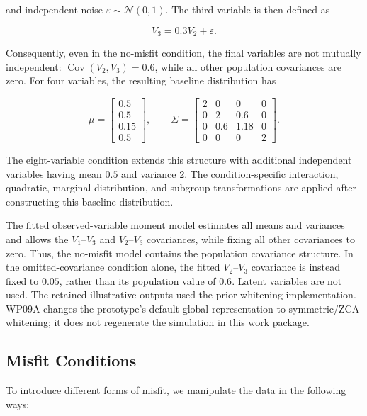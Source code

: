 \documentclass[floatsintext,a4paper]{apa7} %
\begin{document}
	and independent noise $\varepsilon\sim\mathcal{N}(0,1)$. The third variable is then defined as
	
	$$
	V_3=0.3V_2+\varepsilon.
	$$
	
	Consequently, even in the no-misfit condition, the final variables are not mutually independent: $\operatorname{Cov}(V_2,V_3)=0.6$, while all other population covariances are zero. For four variables, the resulting baseline distribution has
	
	$$
	\mu=
	\begin{bmatrix}
		0.5\\
		0.5\\
		0.15\\
		0.5
	\end{bmatrix},
	\qquad
	\Sigma=
	\begin{bmatrix}
		2 & 0 & 0 & 0 \\
		0 & 2 & 0.6 & 0 \\
		0 & 0.6 & 1.18 & 0 \\
		0 & 0 & 0 & 2
	\end{bmatrix}.
	$$
	
	The eight-variable condition extends this structure with additional independent variables having mean $0.5$ and variance $2$. The condition-specific interaction, quadratic, marginal-distribution, and subgroup transformations are applied after constructing this baseline distribution.
	
	The fitted observed-variable moment model estimates all means and variances and allows the $V_1$--$V_3$ and $V_2$--$V_3$ covariances, while fixing all other covariances to zero. Thus, the no-misfit model contains the population covariance structure. In the omitted-covariance condition alone, the fitted $V_2$--$V_3$ covariance is instead fixed to $0.05$, rather than its population value of $0.6$. Latent variables are not used. The retained illustrative outputs used the prior whitening implementation. WP09A changes the prototype's default global representation to symmetric/ZCA whitening; it does not regenerate the simulation in this work package.
	
	\subsection{Misfit Conditions}
	To introduce different forms of misfit, we manipulate the data in the following ways:
	
\end{document}
